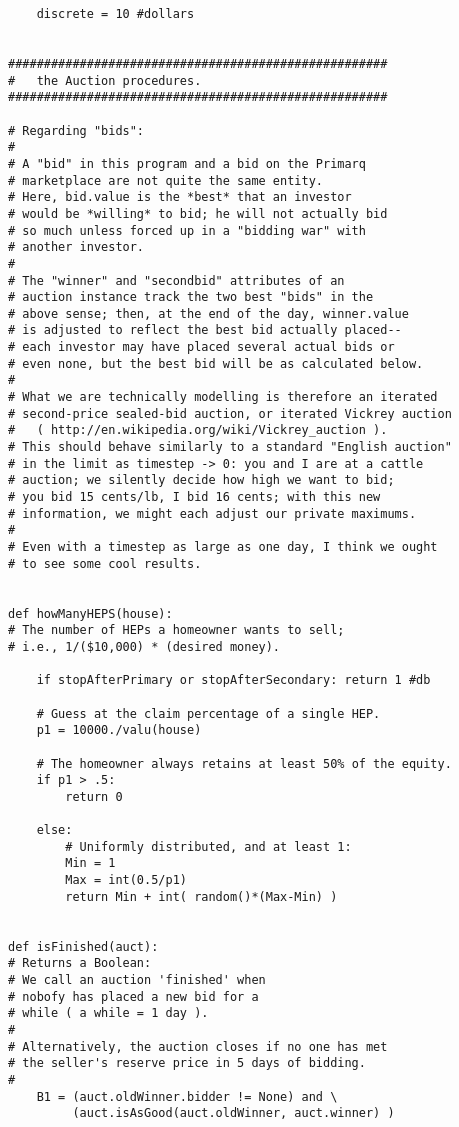 \begin{lstlisting}
    discrete = 10 #dollars


#####################################################
#   the Auction procedures.
#####################################################

# Regarding "bids":
#
# A "bid" in this program and a bid on the Primarq
# marketplace are not quite the same entity.
# Here, bid.value is the *best* that an investor
# would be *willing* to bid; he will not actually bid
# so much unless forced up in a "bidding war" with
# another investor.
#
# The "winner" and "secondbid" attributes of an
# auction instance track the two best "bids" in the
# above sense; then, at the end of the day, winner.value
# is adjusted to reflect the best bid actually placed--
# each investor may have placed several actual bids or
# even none, but the best bid will be as calculated below.
#
# What we are technically modelling is therefore an iterated
# second-price sealed-bid auction, or iterated Vickrey auction
#   ( http://en.wikipedia.org/wiki/Vickrey_auction ).
# This should behave similarly to a standard "English auction"
# in the limit as timestep -> 0: you and I are at a cattle
# auction; we silently decide how high we want to bid;
# you bid 15 cents/lb, I bid 16 cents; with this new
# information, we might each adjust our private maximums.
#
# Even with a timestep as large as one day, I think we ought
# to see some cool results.


def howManyHEPS(house):
# The number of HEPs a homeowner wants to sell;
# i.e., 1/($10,000) * (desired money).

    if stopAfterPrimary or stopAfterSecondary: return 1 #db

    # Guess at the claim percentage of a single HEP.
    p1 = 10000./valu(house)

    # The homeowner always retains at least 50% of the equity.
    if p1 > .5:
        return 0

    else:
        # Uniformly distributed, and at least 1:
        Min = 1
        Max = int(0.5/p1)
        return Min + int( random()*(Max-Min) )
                                

def isFinished(auct):
# Returns a Boolean:
# We call an auction 'finished' when
# nobofy has placed a new bid for a
# while ( a while = 1 day ).
#
# Alternatively, the auction closes if no one has met
# the seller's reserve price in 5 days of bidding.
# 
    B1 = (auct.oldWinner.bidder != None) and \
         (auct.isAsGood(auct.oldWinner, auct.winner) )


\end{lstlisting}
